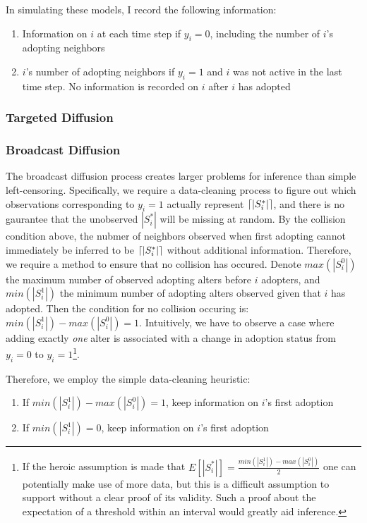 \documentclass{article}
\DeclarePairedDelimiter{\ceil}{\lceil}{\rceil}
\begin{document}
In simulating these models, I record the following information: 
\begin{enumerate}
\item Information on $i$ at each time step if $y_i = 0$, including the number of $i$'s adopting neighbors
\item $i$'s number of adopting neighbors if $y_i = 1$ and $i$ was not active in the last time step. No information is recorded on $i$ after $i$ has adopted
\end{enumerate}

\subsubsection{Targeted Diffusion}



\subsubsection{Broadcast Diffusion}

The broadcast diffusion process creates larger problems for inference than simple left-censoring. Specifically, we require a data-cleaning process to figure out which observations corresponding to $y_i = 1$ actually represent $\ceil{|S_i^*|}$, and there is no gaurantee that the unobserved $|S_i^*|$ will be missing at random. By the collision condition above, the nubmer of neighbors observed when first adopting cannot immediately be inferred to be $\ceil{|S_i^*|}$ without additional information. Therefore, we require a method to ensure that no collision has occured. Denote $max(|S_i^0|)$ the maximum number of observed adopting alters before $i$ adopters, and $min(|S_i^1|)$ the minimum number of adopting alters observed given that $i$ has adopted. Then the condition for no collision occuring is: $min(|S_i^1|) - max(|S_i^0|) = 1$. Intuitively, we have to observe a case where adding exactly \emph{one} alter is associated with a change in adoption status from $y_i = 0$ to $y_i = 1$\footnote{If the heroic assumption is made that $E[|S_i^*|] = \frac{min(|S_i^1|) - max(|S_i^0|)}{2}$ one can potentially make use of more data, but this is a difficult assumption to support without a clear proof of its validity. Such a proof about the expectation of a threshold within an interval would greatly aid inference.}.

Therefore, we employ the simple data-cleaning heuristic:
\begin{enumerate}
\item If $min(|S_i^1|) - max(|S_i^0|) = 1$, keep information on $i$'s first adoption
\item If $min(|S_i^1|) = 0$, keep information on $i$'s first adoption
\end{enumerate}
\end{document}
